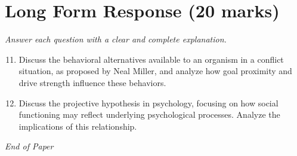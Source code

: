 \documentclass[12pt]{article}
\begin{document}
\section*{Long Form Response (20 marks)}
\textit{Answer each question with a clear and complete explanation.}
\begin{enumerate}[label=\arabic*.]
\setcounter{enumi}{10}
\item Discuss the behavioral alternatives available to an organism in a conflict situation, as proposed by Neal Miller, and analyze how goal proximity and drive strength influence these behaviors.
\item Discuss the projective hypothesis in psychology, focusing on how social functioning may reflect underlying psychological processes. Analyze the implications of this relationship.
\end{enumerate}

\vfill
\noindent\textit{End of Paper}
\end{document}
